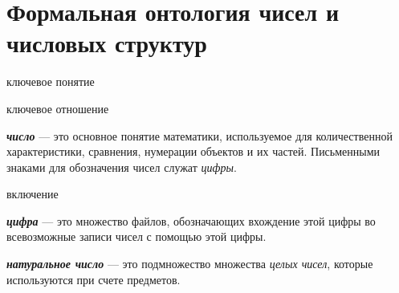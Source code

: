 \begin{SCn}
\begin{SCn}
\begin{SCn}
\end{SCn}	

\section{Формальная онтология чисел и числовых структур}
\label{sec_top_ontologies_numbers}
	
\begin{SCn}
\begin{scnrelfromlist}{ключевое понятие}
\end{scnrelfromlist}

\begin{scnrelfromlist}{ключевое отношение}
\end{scnrelfromlist}
\end{SCn}

\textbf{\textit{число}} --- это основное понятие математики, используемое для количественной характеристики, сравнения, нумерации объектов и их частей. Письменными знаками для обозначения чисел служат \textit{цифры}.

\begin{SCn}
\begin{scnrelfromlist}{включение}
\end{scnrelfromlist}
\end{SCn}

\textbf{\textit{цифра}} --- это множество файлов, обозначающих вхождение этой цифры во всевозможные записи чисел с помощью этой цифры.

\begin{SCn}
\end{SCn}

\textbf{\textit{натуральное число}} --- это подмножество множества \textit{целых чисел}, которые используются при счете предметов.


\begin{SCn}
\end{SCn}


\end{SCn}
\end{SCn}
